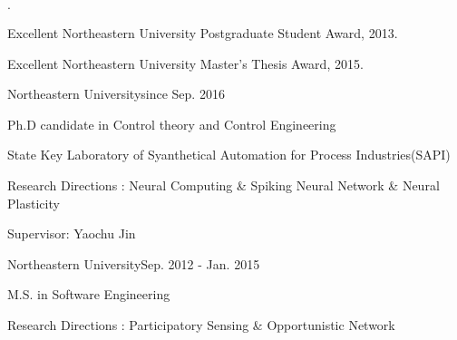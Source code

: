 \documentclass{joel_cv}
\begin{document}
%
%

\begin{sectionItemize}{$\cdot$}
	\item Excellent Northeastern University Postgraduate Student Award, 2013.
    \item Excellent Northeastern University Master's Thesis Award, 2015.
\end{sectionItemize}


%
%



%
%



%
%
\newpage
{}
\begin{sectionContentSimple}{Northeastern University}{since Sep. 2016}
	\item Ph.D candidate in Control theory and Control Engineering
	\item State Key Laboratory of Syanthetical Automation for Process Industries(SAPI)
    \item Research Directions : Neural Computing \& Spiking Neural Network \& Neural Plasticity
	\item Supervisor: Yaochu Jin
\end{sectionContentSimple}

\begin{sectionContentSimple}{Northeastern University}{Sep. 2012 - Jan. 2015}
	\item M.S. in Software Engineering
	\item Research Directions : Participatory Sensing \& Opportunistic Network
\end{sectionContentSimple}
\end{document}
